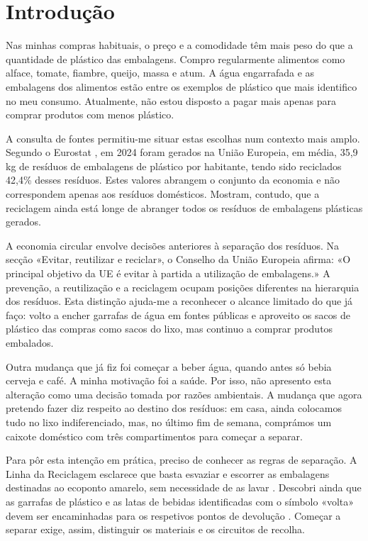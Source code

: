 \section{Introdução}
\label{sec:introducao}

Nas minhas compras habituais, o preço e a comodidade têm mais peso do que
a quantidade de plástico das embalagens. Compro regularmente alimentos
como alface, tomate, fiambre, queijo, massa e atum. A água engarrafada e
as embalagens dos alimentos estão entre os exemplos de plástico que mais
identifico no meu consumo. Atualmente, não estou disposto a pagar mais
apenas para comprar produtos com menos plástico.

A consulta de fontes permitiu-me situar estas escolhas num contexto mais
amplo. Segundo o Eurostat \cite{eurostat2026plastic}, em 2024 foram gerados
na União Europeia, em média, 35,9 kg de resíduos de embalagens de plástico
por habitante, tendo sido reciclados 42,4\% desses resíduos. Estes valores
abrangem o conjunto da economia e não correspondem apenas aos resíduos
domésticos. Mostram, contudo, que a reciclagem ainda está longe de
abranger todos os resíduos de embalagens plásticas gerados.

A economia circular envolve decisões anteriores à separação dos resíduos.
Na secção «Evitar, reutilizar e reciclar», o Conselho da União Europeia afirma:
«O principal objetivo da UE é evitar à partida a utilização de embalagens.»
\cite{conselho2026embalagens}
A prevenção, a reutilização e a reciclagem ocupam posições diferentes
na hierarquia dos resíduos. Esta distinção ajuda-me a reconhecer o
alcance limitado do que já faço: volto a encher garrafas de água em
fontes públicas e aproveito os sacos de plástico das compras como sacos
do lixo, mas continuo a comprar produtos embalados.

Outra mudança que já fiz foi começar a beber água, quando antes só bebia
cerveja e café. A minha motivação foi a saúde. Por isso, não apresento
esta alteração como uma decisão tomada por razões ambientais. A mudança
que agora pretendo fazer diz respeito ao destino dos resíduos: em casa,
ainda colocamos tudo no lixo indiferenciado, mas, no último fim de
semana, comprámos um caixote doméstico com três compartimentos para
começar a separar.

Para pôr esta intenção em prática, preciso de conhecer as regras de
separação. A Linha da Reciclagem esclarece que basta esvaziar e escorrer
as embalagens destinadas ao ecoponto amarelo, sem necessidade de as lavar
\cite{egfReciclagem}. Descobri ainda que as garrafas de plástico e as
latas de bebidas identificadas com o símbolo «volta» devem ser
encaminhadas para os respetivos pontos de devolução
\cite{spvSeparacao}. Começar a separar exige, assim, distinguir os
materiais e os circuitos de recolha.

